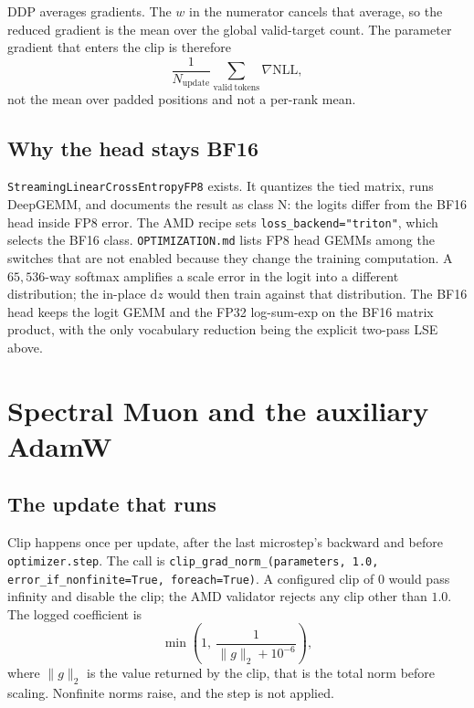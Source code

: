 \documentclass[11pt]{article}
\DeclareRobustCommand{\code}[1]{\texttt{#1}}
\begin{document}
DDP averages gradients. The \(w\) in the numerator cancels that average, so
the reduced gradient is the mean over the global valid-target count. The
parameter gradient that enters the clip is therefore
\begin{equation}
\frac{1}{N_{\mathrm{update}}}\sum_{\mathrm{valid\ tokens}}\nabla \mathrm{NLL},
\end{equation}
not the mean over padded positions and not a per-rank mean.

\subsection{Why the head stays BF16}

\code{StreamingLinearCrossEntropyFP8} exists. It quantizes the tied matrix,
runs DeepGEMM, and documents the result as class N: the logits differ from
the BF16 head inside FP8 error. The AMD recipe sets \code{loss\_backend="triton"},
which selects the BF16 class. \code{OPTIMIZATION.md} lists FP8 head GEMMs
among the switches that are not enabled because they change the training
computation. A \(65{,}536\)-way softmax amplifies a scale error in the logit
into a different distribution; the in-place \(\mathrm{d}z\) would then train
against that distribution. The BF16 head keeps the logit GEMM and the FP32
log-sum-exp on the BF16 matrix product, with the only vocabulary reduction
being the explicit two-pass LSE above.

\section{Spectral Muon and the auxiliary AdamW}
\label{sec:muon}

\subsection{The update that runs}

Clip happens once per update, after the last microstep's backward and before
\code{optimizer.step}. The call is
\code{clip\_grad\_norm\_(parameters, 1.0, error\_if\_nonfinite=True, foreach=True)}.
A configured clip of \(0\) would pass infinity and disable the clip; the AMD
validator rejects any clip other than \(1.0\). The logged coefficient is
\begin{equation}
\min\left(1,\ \frac{1}{\|g\|_2+10^{-6}}\right),
\end{equation}
where \(\|g\|_2\) is the value returned by the clip, that is the total norm
before scaling. Nonfinite norms raise, and the step is not applied.
\end{document}
